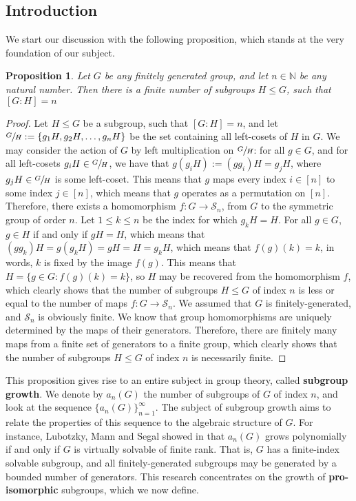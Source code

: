 \documentclass[12pt]{article}
\newtheorem{proposition}[theorem]{Proposition}
\begin{document}
\subsection{Introduction}
We start our discussion with the following proposition, which stands at the very foundation of our subject.
\begin{proposition} \label{prop:finite.number.subgroups}
Let $G$ be any finitely generated group, and let $n\in\mathbb{N}$ be any natural number. Then there is a finite number of subgroups $H\leq G$, such that $[G:H]=n$
\end{proposition}
\begin{proof}
Let $H\leq G$ be a subgroup, such that $[G:H]=n$, and let $\sfrac{G}{H}:=\{g_1H,g_2H,\dots,g_nH\}$ be the set containing all left-cosets of $H$ in $G$. We may consider the action of $G$ by left multiplication on $\sfrac{G}{H}$: for all $g\in G$, and for all left-cosets $g_iH\in\sfrac{G}{H}$, we have that $g(g_iH):=(gg_i)H=g_jH$, where $g_jH\in\sfrac{G}{H}$ is some left-coset. This means that $g$ maps every index $i\in[n]$ to some index $j\in[n]$, which means that $g$ operates as a permutation on $[n]$. Therefore, there exists a homomorphism $f:G\rightarrow\mathcal{S}_n$, from $G$ to the symmetric group of order $n$. Let $1\leq k\leq n$ be the index for which $g_kH=H$. For all $g\in G$, $g\in H$ if and only if $gH=H$, which means that $(gg_k)H=g(g_kH)=gH=H=g_kH$, which means that $f(g)(k)=k$, in words, $k$ is fixed by the image $f(g)$. This means that $H=\{g\in G : f(g)(k)=k\}$, so $H$ may be recovered from the homomorphism $f$, which clearly shows that the number of subgroups $H\leq G$ of index $n$ is less or equal to the number of maps $f : G
\rightarrow\mathcal{S}_n$. We assumed that $G$ is finitely-generated, and $\mathcal{S}_n$ is obviously finite. We know that group homomorphisms are uniquely determined by the maps of their generators. Therefore, there are finitely many maps from a finite set of generators to a finite group, which clearly shows that the number of subgroups $H\leq G$ of index $n$ is necessarily finite.
\end{proof}
This proposition gives rise to an entire subject in group theory, called \textbf{subgroup growth}. We denote by $a_n(G)$ the number of subgroups of $G$ of index $n$, and look at the sequence $\{a_n(G)\}_{n=1}^{\infty}$. The subject of subgroup growth aims to relate the properties of this sequence to the algebraic structure of $G$. For instance, Lubotzky, Mann and Segal showed in \cite{LubotzkyMannSegal} that $a_n(G)$ grows polynomially if and only if $G$ is virtually solvable of finite rank. That is, $G$ has a finite-index solvable subgroup, and all finitely-generated subgroups may be generated by a bounded number of generators. This research concentrates on the growth of \textbf{pro-isomorphic} subgroups, which we now define.
\end{document}
